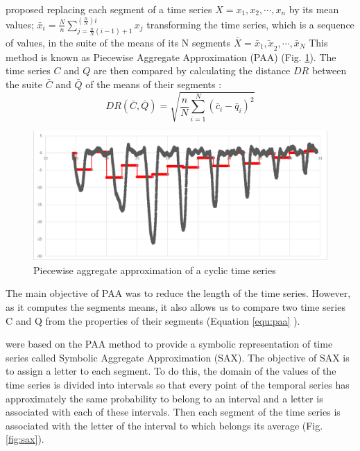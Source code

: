 \cite{keogh2001dimensionality} proposed replacing each segment of a time series
$X=x_{1},x_{2},\cdots,x_{n}$ by its mean values;
$\bar{x}_{i}=\frac{N}{n}\sum_{j=\frac{n}{N}(i-1)+1}^{(\frac{n}{N})i}x_{j}$  transforming the time
series, which is a sequence of values, in the suite of the means of its N segments
$\bar{X}=\bar{x}_{1}\bar{,x}_{2},\cdots,\bar{x}_{N}$ This method is known as Piecewise Aggregate
Approximation (PAA) (Fig. \ref{fig:paa}). The time series $C$ and $Q$ are then compared by calculating the distance $DR$
between the suite $\bar{C}$ and $\bar{Q}$ of the means of their segments :
\begin{equation}
DR(\bar{C},\bar{Q})=\sqrt{\frac{n}{N}\sum_{i=1}^{N}(\bar{c}_{i}-\bar{q}_{i})^{2}}
\label{equ:paa}
\end{equation}

 \begin{figure}[h]
  \centering
   \includegraphics[scale=0.4]{images/sax-p/paa}
    \caption{Piecewise aggregate approximation of a cyclic time series}
  \label{fig:paa}
  \end{figure}

The main objective of PAA was to reduce the length of the time series. However, 
as it computes the segments means, it also allows us to compare two time series C and Q from 
the properties of their 
segments (Equation \ref{equ:paa} ).


\cite{lin2003symbolic} were based on the PAA method to provide a symbolic representation of time
series called Symbolic Aggregate Approximation (SAX). The objective of SAX is to assign a letter to
each segment. To do this, the domain of the values of the time series is divided into intervals
so that every point of the temporal series has approximately the same probability to belong to an 
interval and a letter is associated with each of these intervals.  Then each segment of the time
series is associated with the letter of the interval  to which belongs its average (Fig. \ref{fig:sax}).

